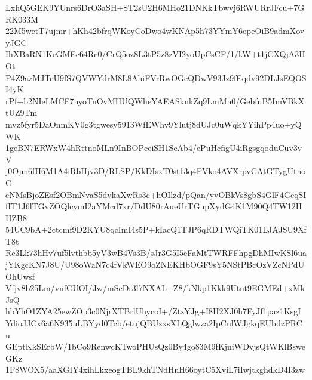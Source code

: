 LxhQ5GEK9YUnrs6DrO3aSH+ST2sU2H6MHo21DNKkTbwvj6RWURrJFcu+7GRK033M
22M5wetT7ujmr+hKh42bfrqWKoyCoDwo4wKNAp5h73YYmY6epeOiB9admXovyJGC
IhXBaRN1KrGMEc64Rc0/CrQ5oz8L3tP5z8zVI2yoUpCsCF/1/kW+t1jCXQjA3HOt
P4Z9azMJTcU9fS7QVWYdrM8L8AhiFVrRwOGcQDwV93Jz9fEqdv92DLJsEQOSI4yK
rPf+b2NIeLMCF7nyoTnOvMHUQWheYAEASknkZq9LmMn0/GebfnB5ImVBkXtUZ9Tm
mvz5fyr5DaOnmKV0g3tgwesy5913WfEWhv9Ylutj8dUJc0uWqkYYihPp4uo+yQWK
1geBN7ERWxW4hRttnoMLn9InBOPceiSH1SeAb4/ePuHcfigU4iRgsgqoduCuv3vV
j0Ojm6fH6M1A4iRbHjv3D/RLSP/KkDIsxT0st13q4FVko4AVXrpvCAtGTygUtnoC
eNMsBjoZEsf2OBmNvaS5dvkaXwRs3c+hOIlzd/pQan/yvOBkVs8gbS4GlF4GcqSI
fIT1J6lTGvZOQlcymI2aYMcd7xr/DdU80rAueUrTGupXydG4K1M90Q4TW12HHZB8
54UC9bA+2ctcmf9D2KYU8qcImI4s5P+kIacQ1TJP6qRDTWQiTK01LJAJSU9XfT8t
Rc3Lk73hHv7uf5lvthbb5yV3wB4Vs3B/sJr3G5I5eFaMtTWRFFhpgDhMIwKSl6ua
jYKgcKN7J8U/U98oWaN7c4fVkWEO9oZNEKHbOGF9sY5NStPBcOzVZcNPdUOhUwsf
Vfjv8b25Lm/vnfCUOI/Jw/mScDr3l7NXAL+Z8/kNkp1Kkk9Utnt9EGMEd+xMkJsQ
hbYhO1ZYA25ewZOp3c0NjrXTBrlUhycoI+/ZtzYJg+I8H2XJ0h7FyJf1paz1KsgI
YdioJJCx6a6N935uLBYyd0Tcb/etujQBUzxsXLQglwza2IpCulWJgkqEUbdzPRCu
GEptKkSErbW/1bCo9RenwcKTwoPHUsQz0By4go83M9fKjniWDvjsQtWKlBsweGKz
1F8WOX5/aaXGIY4xihLkxeogTBL9khTNdHnH66oytC5XviL7iIwjtkghdkD4I3zw
